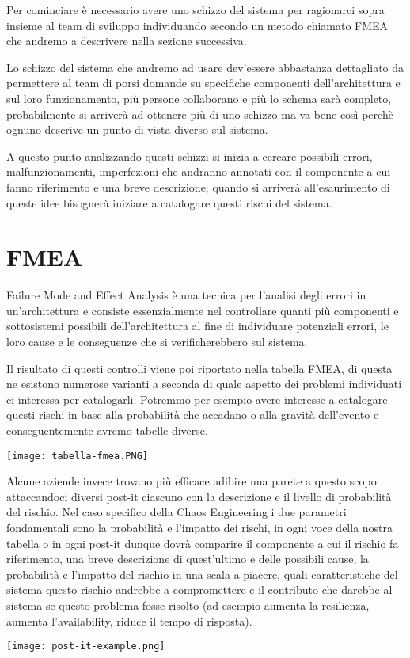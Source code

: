 Per cominciare è necessario avere uno schizzo del sistema per ragionarci sopra insieme al team di sviluppo individuando secondo un metodo chiamato FMEA che andremo a descrivere nella sezione successiva.

Lo schizzo del sistema che andremo ad usare dev'essere abbastanza dettagliato da permettere al team di porsi domande su specifiche componenti dell'architettura e sul loro funzionamento, più persone collaborano e più lo schema sarà completo, probabilmente si arriverà ad ottenere più di uno schizzo ma va bene così perchè ognuno descrive un punto di vista diverso sul sistema.

A questo punto analizzando questi schizzi si inizia a cercare possibili errori, malfunzionamenti, imperfezioni che andranno annotati con il componente a cui fanno riferimento e una breve descrizione; quando si arriverà all'esaurimento di queste idee bisognerà iniziare a catalogare questi rischi del sistema.

\section{FMEA}
Failure Mode and Effect Analysis è una tecnica per l'analisi degli errori in un'architettura e consiste essenzialmente nel controllare quanti più componenti e sottosistemi possibili dell'architettura al fine di individuare potenziali errori, le loro cause e le conseguenze che si verificherebbero sul sistema.

Il risultato di questi controlli viene poi riportato nella tabella FMEA, di questa ne esistono numerose varianti a seconda di quale aspetto dei problemi individuati ci interessa per catalogarli.
Potremmo per esempio avere interesse a catalogare questi rischi in base alla probabilità che accadano o alla gravità dell'evento e conseguentemente avremo tabelle diverse.
\begin{center}
    \centering
    \texttt{[image: tabella-fmea.PNG]}
    \label{tab:esempio-tabella-fmea}
\end{center}

Alcune aziende invece trovano più efficace adibire una parete a questo scopo attaccandoci diversi post-it ciascuno con la descrizione e il livello di probabilità del rischio.
Nel caso specifico della Chaos Engineering i due parametri fondamentali sono la probabilità e l'impatto dei rischi, in ogni voce della nostra tabella o in ogni post-it dunque dovrà comparire il componente a cui il rischio fa riferimento, una breve descrizione di quest'ultimo e delle possibili cause, la probabilità e l'impatto del rischio in una scala a piacere, quali caratteristiche del sistema questo rischio andrebbe a compromettere e il contributo che darebbe al sistema se questo problema fosse risolto (ad esempio aumenta la resilienza, aumenta l'availability, riduce il tempo di risposta).
\begin{center}
    \centering
    \texttt{[image: post-it-example.png]}
    \label{tab:fmea-post-it}
\end{center}

